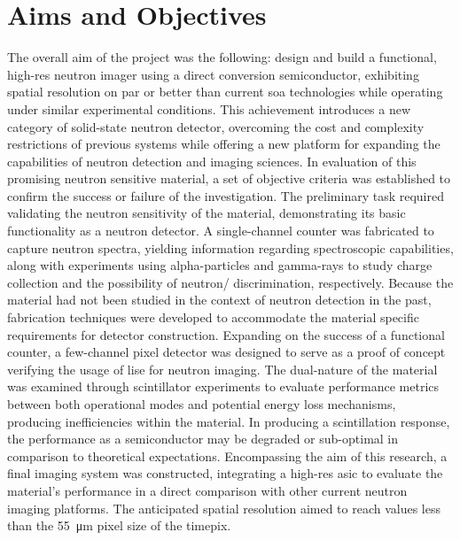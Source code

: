 \documentclass[../../main.tex]{subfiles}
\begin{document}
%
    \section{Aims and Objectives}%
    \label{sec:chapter-1:objectives}%
    The overall aim of the project was the following: design and build a functional, \gls{high-res} neutron imager using a direct conversion semiconductor, exhibiting spatial resolution on par or better than current \gls{soa} technologies while operating under similar experimental conditions. 
    This achievement introduces a new category of \gls{solid-state} neutron detector, overcoming the cost and complexity restrictions of previous systems while offering a new platform for expanding the capabilities of neutron detection and imaging sciences.
    In evaluation of this promising neutron sensitive material, a set of objective criteria was established to confirm the success or failure of the investigation.
    The preliminary task required validating the neutron sensitivity of the material, demonstrating its basic functionality as a neutron detector.
    A single-channel counter was fabricated to capture neutron spectra, yielding information regarding spectroscopic capabilities, along with experiments using \glspl{alpha-particle} and \glspl{gamma-ray} to study charge collection and the possibility of neutron/\Xmath{\gamma} discrimination, respectively.
    Because the material had not been studied in the context of neutron detection in the past, fabrication techniques were developed to accommodate the material specific requirements for detector construction.
    Expanding on the success of a functional counter, a few-channel pixel detector was designed to serve as a proof of concept verifying the usage of \gls{lise} for neutron imaging.
    The dual-nature of the material was examined through scintillator experiments to evaluate performance metrics between both operational modes and potential energy loss mechanisms, producing inefficiencies within the material. 
    In producing a scintillation response, the performance as a semiconductor may be degraded or sub-optimal in comparison to theoretical expectations.
    Encompassing the aim of this research, a final imaging system was constructed, integrating a \gls{high-res} \gls{asic} to evaluate the material's performance in a direct comparison with other current neutron imaging platforms.
    The anticipated spatial resolution aimed to reach values less than the \SI{55}{\micro\meter} pixel size of the \gls{timepix}.
\end{document}
